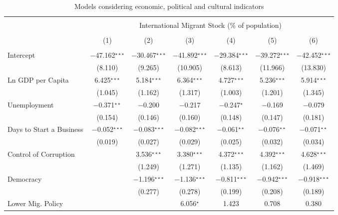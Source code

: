 \documentclass[../main.tex]{subfiles}
\begin{document}
\begin{table}[H]\centering 
 \caption{Models considering economic, political and cultural indicators} 
   \label{tab:1} 
  \scriptsize
 \begin{tabular}{@{\extracolsep{5pt}}lcccccc}
 \toprule 
\\[-1.8ex] & \multicolumn{6}{c}{International Migrant Stock (\% of population)} \\ 
\\[-1.8ex] & (1) & (2) & (3) & (4) & (5) & (6)\\ 
\midrule \\[-1.8ex] 
 Intercept & $-$47.162$^{\star\star\star}$ & $-$30.467$^{\star\star\star}$ & $-$41.892$^{\star\star\star}$ & $-$29.384$^{\star\star\star}$ & $-$39.272$^{\star\star\star}$ & $-$42.452$^{\star\star\star}$ \\ 
  & (8.110) & (9.265) & (10.905) & (8.613) & (11.966) & (13.830) \\ 
  Ln GDP per Capita & 6.425$^{\star\star\star}$ & 5.184$^{\star\star\star}$ & 6.364$^{\star\star\star}$ & 4.727$^{\star\star\star}$ & 5.236$^{\star\star\star}$ & 5.914$^{\star\star\star}$ \\ 
  & (1.045) & (1.162) & (1.317) & (1.003) & (1.201) & (1.345) \\ 
  Unemployment & $-$0.371$^{\star\star}$ & $-$0.200 & $-$0.217 & $-$0.247$^{\star}$ & $-$0.169 & $-$0.079 \\ 
  & (0.154) & (0.146) & (0.160) & (0.148) & (0.147) & (0.181) \\ 
  Days to Start a Business & $-$0.052$^{\star\star\star}$ & $-$0.083$^{\star\star\star}$ & $-$0.082$^{\star\star\star}$ & $-$0.061$^{\star\star}$ & $-$0.076$^{\star\star}$ & $-$0.071$^{\star\star}$ \\ 
  & (0.019) & (0.027) & (0.029) & (0.025) & (0.032) & (0.034) \\ 
  Control of Corruption &  & 3.536$^{\star\star\star}$ & 3.380$^{\star\star\star}$ & 4.372$^{\star\star\star}$ & 4.392$^{\star\star\star}$ & 4.628$^{\star\star\star}$ \\ 
  &  & (1.249) & (1.271) & (1.135) & (1.162) & (1.469) \\ 
  Democracy &  & $-$1.196$^{\star\star\star}$ & $-$1.136$^{\star\star\star}$ & $-$0.811$^{\star\star\star}$ & $-$0.942$^{\star\star\star}$ & $-$0.918$^{\star\star\star}$ \\ 
  &  & (0.277) & (0.278) & (0.199) & (0.208) & (0.189) \\ 
  Lower Mig. Policy  &  &  & 6.056$^{\star}$ & 1.423 & 0.708 & 0.380 \\ 

\end{tabular}
\end{table}
\end{document}
